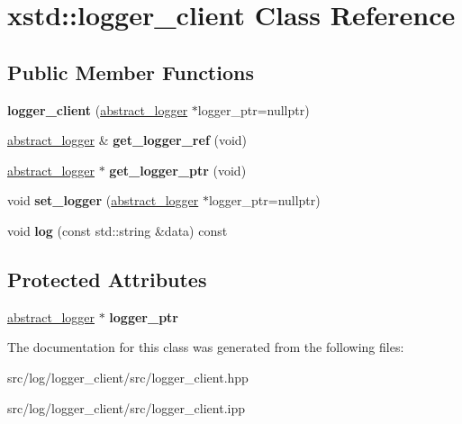 \hypertarget{classxstd_1_1logger__client}{\section{xstd\-:\-:logger\-\_\-client Class Reference}
\label{classxstd_1_1logger__client}
}
\subsection*{Public Member Functions}
\begin{DoxyCompactItemize}
\item 
\hypertarget{classxstd_1_1logger__client_ae366adb742d038fa072522500d798ce8}{{\bfseries logger\-\_\-client} (\hyperlink{classxstd_1_1abstract__logger}{abstract\-\_\-logger} $\ast$logger\-\_\-ptr=nullptr)}\label{classxstd_1_1logger__client_ae366adb742d038fa072522500d798ce8}

\item 
\hypertarget{classxstd_1_1logger__client_a4567aa30484c31b0d53089d1d08f8fab}{\hyperlink{classxstd_1_1abstract__logger}{abstract\-\_\-logger} \& {\bfseries get\-\_\-logger\-\_\-ref} (void)}\label{classxstd_1_1logger__client_a4567aa30484c31b0d53089d1d08f8fab}

\item 
\hypertarget{classxstd_1_1logger__client_a436c05e8f5d01fa5ed01aea36d1c5390}{\hyperlink{classxstd_1_1abstract__logger}{abstract\-\_\-logger} $\ast$ {\bfseries get\-\_\-logger\-\_\-ptr} (void)}\label{classxstd_1_1logger__client_a436c05e8f5d01fa5ed01aea36d1c5390}

\item 
\hypertarget{classxstd_1_1logger__client_a058f72e775905783e79721ecb2a65349}{void {\bfseries set\-\_\-logger} (\hyperlink{classxstd_1_1abstract__logger}{abstract\-\_\-logger} $\ast$logger\-\_\-ptr=nullptr)}\label{classxstd_1_1logger__client_a058f72e775905783e79721ecb2a65349}

\item 
\hypertarget{classxstd_1_1logger__client_a7169793d2c5512150d611ae47e0c6b74}{void {\bfseries log} (const std\-::string \&data) const }\label{classxstd_1_1logger__client_a7169793d2c5512150d611ae47e0c6b74}

\end{DoxyCompactItemize}
\subsection*{Protected Attributes}
\begin{DoxyCompactItemize}
\item 
\hypertarget{classxstd_1_1logger__client_a6f1cc6e74cfa370ec516e3fa792b3f1c}{\hyperlink{classxstd_1_1abstract__logger}{abstract\-\_\-logger} $\ast$ {\bfseries logger\-\_\-ptr}}\label{classxstd_1_1logger__client_a6f1cc6e74cfa370ec516e3fa792b3f1c}

\end{DoxyCompactItemize}


The documentation for this class was generated from the following files\-:\begin{DoxyCompactItemize}
\item 
src/log/logger\-\_\-client/src/logger\-\_\-client.\-hpp\item 
src/log/logger\-\_\-client/src/logger\-\_\-client.\-ipp\end{DoxyCompactItemize}
